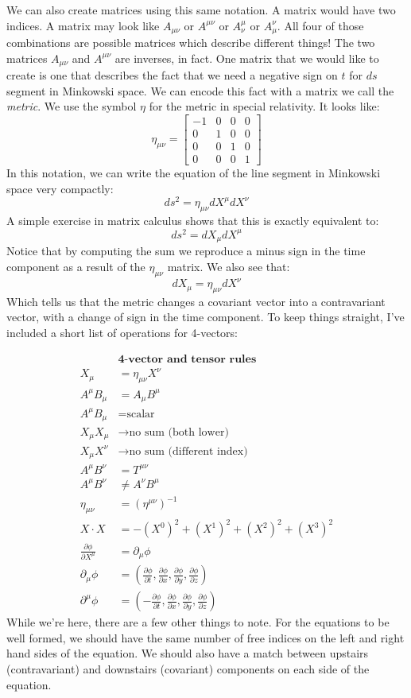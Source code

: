 We can also create matrices using this same notation. A matrix would have two indices. A matrix may look like $A_{\mu\nu}$ or $A^{\mu\nu}$ or $A^\mu_\nu$ or $A_\mu^\nu$. All four of those combinations are possible matrices which describe different things! The two matrices $A_{\mu\nu}$ and $A^{\mu\nu}$ are inverses, in fact. One matrix that we would like to create is one that describes the fact that we need a negative sign on $t$ for $ds$ segment in Minkowski space. We can encode this fact with a matrix we call the \textit{metric}. We use the symbol $\eta$ for the metric in special relativity. It looks like:
$$\eta_{\mu\nu}=\begin{bmatrix}
    -1&0&0&0\\0&1&0&0\\0&0&1&0\\0&0&0&1
\end{bmatrix}$$
In this notation, we can write the equation of the line segment in Minkowski space very compactly:
$$ds^2=\eta_{\mu\nu}dX^\mu dX^\nu$$
A simple exercise in matrix calculus shows that this is exactly equivalent to:
$$ds^2=dX_\mu dX^\mu$$
Notice that by computing the sum we reproduce a minus sign in the time component as a result of the $\eta_{\mu\nu}$ matrix. We also see that:
$$dX_\mu=\eta_{\mu\nu}dX^\nu$$
Which tells us that the metric changes a covariant vector into a contravariant vector, with a change of sign in the time component. To keep things straight, I've included a short list of operations for 4-vectors:

\[
\begin{array}{rl}
&\textbf{4-vector and tensor rules} \\
\hline
X_\mu &= \eta_{\mu\nu}X^\nu  \\
A^\mu B_\mu&=A_\mu B^\mu\\
A^\mu B_\mu&=\text{scalar}\\
X_\mu X_\mu&\rightarrow \text{no sum (both lower)}\\
X_\mu X^\nu&\rightarrow \text{no sum (different index)}\\
A^\mu B^\nu &= T^{\mu\nu}\\
A^\mu B^\nu &\neq A^\nu B^\mu\\
\eta_{\mu\nu}&=(\eta^{\mu\nu})^{-1}\\
X\cdot X &= -(X^0)^2+(X^1)^2+(X^2)^2+(X^3)^2\\
\frac{\partial \phi}{\partial X^\mu}&=\partial_\mu \phi\\
\partial_\mu\phi &= \left(\frac{\partial \phi}{\partial t},\frac{\partial \phi}{\partial x},\frac{\partial \phi}{\partial y},\frac{\partial \phi}{\partial z}\right)\\
\partial^\mu\phi &= \left(-\frac{\partial \phi}{\partial t},\frac{\partial \phi}{\partial x},\frac{\partial \phi}{\partial y},\frac{\partial \phi}{\partial z}\right)
\end{array}
\]
While we're here, there are a few other things to note. For the equations to be well formed, we should have the same number of free indices on the left and right hand sides of the equation. We should also have a match between upstairs (contravariant) and downstairs (covariant) components on each side of the equation.

